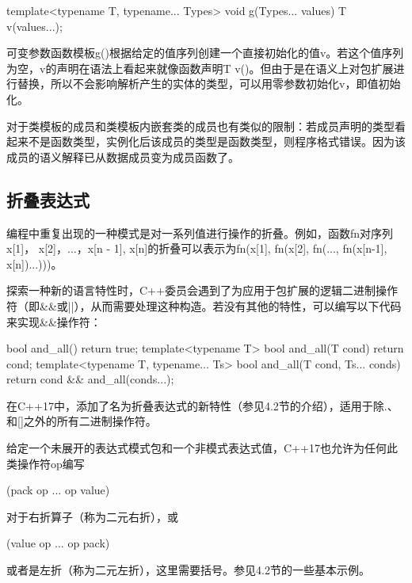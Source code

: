 \begin{cpp}
template<typename T, typename... Types>
void g(Types... values) {
	T v(values...);
}
\end{cpp}

可变参数函数模板g()根据给定的值序列创建一个直接初始化的值v。若这个值序列为空，v的声明在语法上看起来就像函数声明T v()。但由于是在语义上对包扩展进行替换，所以不会影响解析产生的实体的类型，可以用零参数初始化v，即值初始化。

\begin{notice}
对于类模板的成员和类模板内嵌套类的成员也有类似的限制：若成员声明的类型看起来不是函数类型，实例化后该成员的类型是函数类型，则程序格式错误。因为该成员的语义解释已从数据成员变为成员函数了。
\end{notice}

\subsection{折叠表达式}

编程中重复出现的一种模式是对一系列值进行操作的折叠。例如，函数fn对序列x[1]， x[2]，...，x[n - 1], x[n]的折叠可以表示为fn(x[1], fn(x[2], fn(..., fn(x[n-1], x[n])...)))。

探索一种新的语言特性时，C++委员会遇到了为应用于包扩展的逻辑二进制操作符（即\&\&或||），从而需要处理这种构造。若没有其他的特性，可以编写以下代码来实现\&\&操作符：

\begin{cpp}
bool and_all() { return true; }
template<typename T>
	bool and_all(T cond) { return cond; }
template<typename T, typename... Ts>
	bool and_all(T cond, Ts... conds) {
		return cond && and_all(conds...);
	}
\end{cpp}

在C++17中，添加了名为折叠表达式的新特性（参见4.2节的介绍），适用于除.、\inlcpp{->} 和[]之外的所有二进制操作符。

给定一个未展开的表达式模式包和一个非模式表达式值，C++17也允许为任何此类操作符op编写

\begin{cpp}
(pack op ... op value)
\end{cpp}

对于右折算子（称为二元右折），或

\begin{cpp}
(value op ... op pack)
\end{cpp}

或者是左折（称为二元左折），这里需要括号。参见4.2节的一些基本示例。

